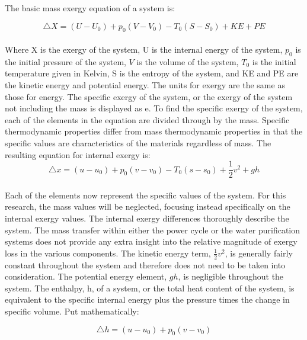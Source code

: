 \documentclass[12pt]{UIdahoMastersThesis}
\begin{document}
%  
% 

The basic mass exergy equation of a system is\cite{moran2010fundamentals}:

\begin{equation}
\triangle X=(U-U_0)+p_0(V-V_0)-T_0(S-S_0)+KE+PE
\end{equation}
\\
Where X is the exergy of the system, U is the internal energy of the system, $p_0$ is the initial pressure of the system, $V$ is the volume of the system, $T_0$ is the initial temperature given in Kelvin, S is the entropy of the system, and KE and PE are the kinetic energy and potential energy. The units for exergy are the same as those for energy. The specific exergy of the system, or the exergy of the system not including the mass is displayed as e.  To find the specific exergy of the system, each of the elements in the equation are divided through by the mass. Specific thermodynamic properties differ from mass thermodynamic properties in that the specific values are characteristics of the materials regardless of mass. The resulting equation for internal exergy is:
\begin{equation}
\label{specificX}
\triangle x=(u-u_0)+p_0(v-v_0)-T_0(s-s_0)+\frac{1}{2}v^2+gh
\end{equation}
\\

Each of the elements now represent the specific values of the system.  For this research, the mass values will be neglected, focusing instead specifically on the internal exergy values. The internal exergy differences thoroughly describe the system.  The mass transfer within either the power cycle or the water purification systems does not provide any extra insight into the relative magnitude of exergy loss in the various components. The kinetic energy term, $\frac{1}{2}v^2$, is generally fairly constant throughout the system and therefore does not need to be taken into consideration.  The potential energy element, $gh$, is negligible throughout the system. The enthalpy, h, of a system, or the total heat content of the system, is equivalent to the specific internal energy plus the pressure times the change in specific volume.  Put mathematically:

\begin{equation}
\triangle h=(u-u_0)+p_0(v-v_0)
\end{equation}
\end{document}
